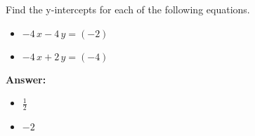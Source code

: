  Find the y-intercepts for each of the following equations. \begin{itemize}\item \( -4 \, x - 4 \, y = \left(-2\right) \)\item \( -4 \, x + 2 \, y = \left(-4\right) \)\end{itemize}

        \textbf{Answer:} \begin{itemize}\item \( \frac{1}{2} \)\item \( -2 \)\end{itemize}
